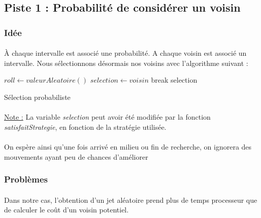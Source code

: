 \documentclass[a4paper,10pt]{report}
\begin{document}
\subsection{Piste 1 : Probabilité de considérer un voisin}
\subsubsection{Idée}

\paragraph{}
À chaque intervalle est associé une probabilité. A chaque voisin est associé un intervalle. Nous sélectionnons
désormais nos voisins avec l'algorithme suivant :

\begin{algorithm}[h]
  \begin{algorithmic}
    \Ensure 
      \State $roll\gets valeurAleatoire()$
	\State $selection \gets voisin$
	\State break
      \EndIf
    \EndFor
      \Function
      \Return selection
    \EndIf
  \end{algorithmic}
  \caption{Sélection probabiliste}
\end{algorithm}

\paragraph{}
\underline{Note :} La variable \textit{selection} peut avoir été modifiée par la fonction \textit{satisfaitStrategie},
en fonction de la stratégie utilisée.

\paragraph{}
  On espère ainsi qu'une fois arrivé en milieu ou fin de recherche, on ignorera des mouvements ayant peu de
chances d'améliorer 

\subsubsection{Problèmes}

\paragraph{}
  Dans notre cas, l'obtention d'un jet aléatoire prend plus de temps processeur que de calculer le coût d'un
voisin potentiel.
\end{document}
